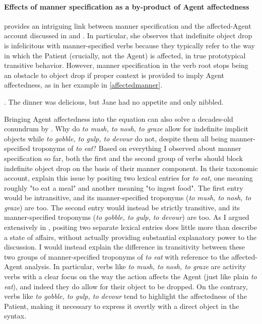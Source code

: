 \paragraph{Effects of manner specification as a by-product of Agent affectedness}
\textcite[139]{Naess2007} provides an intriguing link between manner specification and the affected-Agent account discussed in  and . In particular, she observes that indefinite object drop is infelicitous with manner-specified verbs because they typically refer to the way in which the Patient (crucially, not the Agent) is affected, in true prototypical transitive behavior. However, manner specification in the verb root stops being an obstacle to object drop if proper context is provided to imply Agent affectedness, as in her example in \ref{affectedmanner}.

\ex. \label{affectedmanner} The dinner was delicious, but Jane had no appetite and only nibbled.

Bringing Agent affectedness into the equation can also solve a decades-old conundrum by \textcite{FellbaumKegl1989taxonomic}. Why do \textit{to mush, to nosh, to graze} allow for indefinite implicit objects while \textit{to gobble, to gulp, to devour} do not, despite them all being manner-specified troponyms of \textit{to eat}? Based on everything I observed about manner specification so far, both the first and the second group of verbs should block indefinite object drop on the basis of their manner component. In their taxonomic account, \textcite{FellbaumKegl1989taxonomic} explain this issue by positing two lexical entries for \textit{to eat}, one meaning roughly "to eat a meal" and another meaning "to ingest food". The first entry would be intransitive, and its manner-specified troponyms (\textit{to mush, to nosh, to graze}) are too. The second entry would instead be strictly transitive, and its manner-specified troponyms (\textit{to gobble, to gulp, to devour}) are too. As I argued extensively in , positing two separate lexical entries does little more than describe a state of affairs, without actually providing substantial explanatory power to the discussion. I would instead explain the difference in transitivity between these two groups of manner-specified troponyms of \textit{to eat} with reference to the affected-Agent analysis. In particular, verbs like \textit{to mush, to nosh, to graze} are activity verbs with a clear focus on the way the action affects the Agent (just like plain \textit{to eat}), and indeed they do allow for their object to be dropped. On the contrary, verbs like \textit{to gobble, to gulp, to devour} tend to highlight the affectedness of the Patient, making it necessary to express it overtly with a direct object in the syntax.

